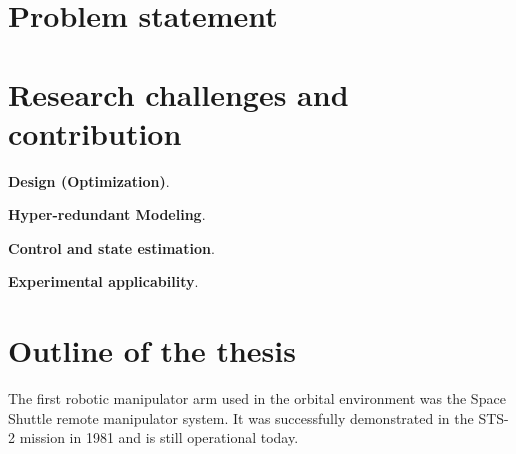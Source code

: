 \section{Problem statement}

\section{Research challenges and contribution}
\noindent \textbf{Design (Optimization)}.


\noindent \textbf{Hyper-redundant Modeling}.

\noindent \textbf{Control and state estimation}.

\noindent \textbf{Experimental applicability}.

\section{Outline of the thesis}



% 


The first robotic manipulator arm used in the orbital environment was the Space Shuttle remote manipulator system. It was successfully demonstrated in the STS-2 mission in 1981 and is still operational today.

